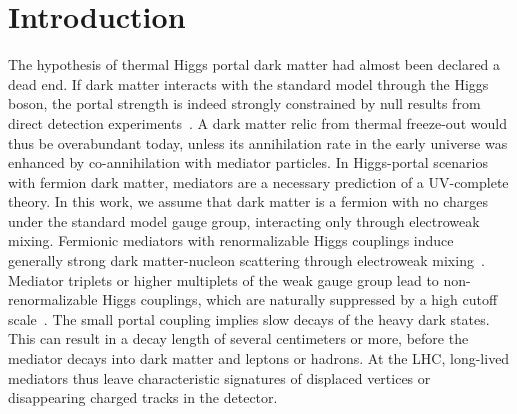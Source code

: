 \documentclass[nofootinbib,prd,aps,superscriptaddress,preprintnumbers]{revtex4}
\begin{document}
\section{Introduction}
%
\noindent
The hypothesis of thermal Higgs portal dark matter had almost been declared a dead end. If dark matter interacts with the standard model through the Higgs boson, the portal strength is indeed strongly constrained by null results from direct detection experiments~\cite{Fedderke:2014wda,Beniwal:2015sdl,Escudero:2016gzx,Arcadi:2017kky,Athron:2018hpc}. A dark matter relic from thermal freeze-out would thus be overabundant today, unless its annihilation rate in the early universe was enhanced by co-annihilation with mediator particles. In Higgs-portal scenarios with fermion dark matter, mediators are a necessary prediction of a UV-complete theory. In this work, we assume that dark matter is a fermion with no charges under the standard model gauge group, interacting only through electroweak mixing. Fermionic mediators with renormalizable Higgs couplings induce generally strong dark matter-nucleon scattering through electroweak mixing~\cite{Mahbubani:2005pt,Dedes:2014hga,Freitas:2015hsa,Tait:2016qbg,Lopez-Honorez:2017ora}. Mediator triplets or higher multiplets of the weak gauge group lead to non-renormalizable Higgs couplings, which are naturally suppressed by a high cutoff scale~\cite{Bharucha:2017ltz}. The small portal coupling implies slow decays of the heavy dark states. This can result in a decay length of several centimeters or more, before the mediator decays into dark matter and leptons or hadrons. At the LHC, long-lived mediators thus leave characteristic signatures of displaced vertices or disappearing charged tracks in the detector.
\end{document}
